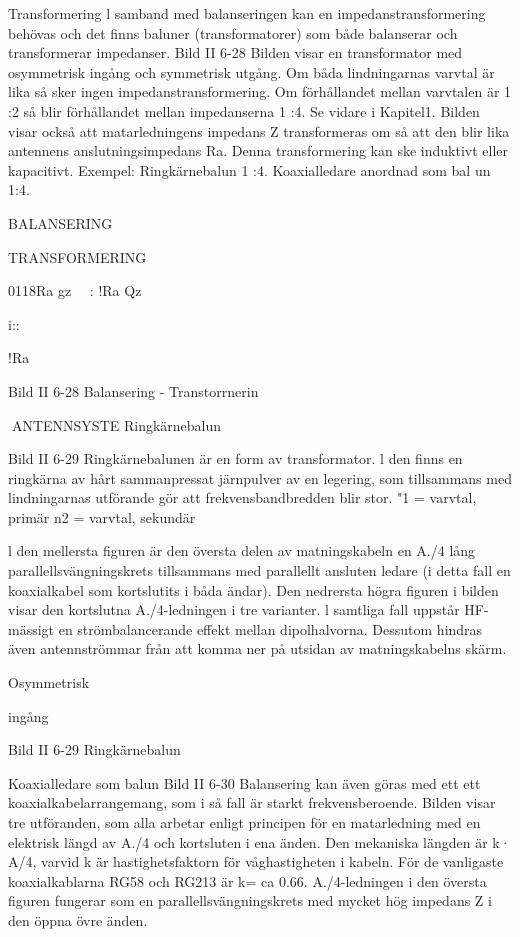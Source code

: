 {{Transformering
l samband med balanseringen kan en
impedanstransformering behövas och det
finns baluner (transformatorer) som både
balanserar och transformerar impedanser.
Bild II 6-28
Bilden visar en transformator med osymmetrisk ingång och symmetrisk utgång. Om
båda lindningarnas varvtal är lika så sker
ingen impedanstransformering. Om förhållandet mellan varvtalen är 1 :2 så blir förhållandet mellan impedanserna 1 :4. Se vidare
i Kapitel1.
Bilden visar också att matarledningens
impedans Z transformeras om så att den blir
lika antennens anslutningsimpedans Ra.
Denna transformering kan ske induktivt eller kapacitivt.
Exempel:
Ringkärnebalun 1 :4.
Koaxialledare anordnad som bal un 1:4.

BALANSERING

TRANSFORMERING

0118Ra
gz
~~: !Ra
Qz

i::

!Ra

Bild II 6-28 Balansering - Transtorrnerin

ANTENNSYSTE
Ringkärnebalun

Bild II 6-29
Ringkärnebalunen är en form av transformator. l den finns en ringkärna av hårt
sammanpressat järnpulver av en legering,
som tillsammans med lindningarnas utförande gör att frekvensbandbredden blir stor.
"1 = varvtal, primär
n2 = varvtal, sekundär

l den mellersta figuren är den översta
delen av matningskabeln en A./4 lång parallellsvängningskrets tillsammans med parallellt ansluten ledare (i detta fall en koaxialkabel som kortslutits i båda ändar). Den
nedrersta högra figuren i bilden visar den
kortslutna A./4-ledningen i tre varianter. l
samtliga fall uppstår HF-mässigt en strömbalancerande effekt mellan dipolhalvorna.
Dessutom hindras även antennströmmar från att komma ner på utsidan av matningskabelns skärm.

Osymmetrisk

ingång

Bild II 6-29 Ringkärnebalun

Koaxialledare som balun
Bild II 6-30
Balansering kan även göras med ett ett
koaxialkabelarrangemang, som i så fall är
starkt frekvensberoende. Bilden visar tre
utföranden, som alla arbetar enligt principen för en matarledning med en elektrisk
längd av A./4 och kortsluten i ena änden.
Den mekaniska längden är k· A/4, varvid
k är hastighetsfaktorn för våghastigheten i
kabeln. För de vanligaste koaxialkablarna
RG58 och RG213 är k= ca 0.66.
A./4-ledningen i den översta figuren fungerar som en parallellsvängningskrets med
mycket hög impedans Z i den öppna övre
änden.

}}

